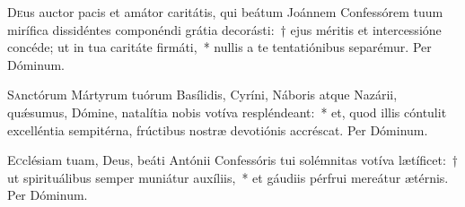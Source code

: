 \documentclass[vesperale_romanum.tex]{subfiles}
\begin{document}

\oratio
\lettrine{D}{e}us auctor pacis et amátor caritátis, qui beátum Joánnem Confessórem tuum mirífica dissidéntes componéndi grátia decorásti:~† ejus méritis et intercessióne concéde; ut in tua caritáte firmáti,~* nullis a te tentatiónibus separémur. Per Dóminum.


\oratio
\lettrine{S}{a}nctórum Mártyrum tuórum Basílidis, Cyríni, Náboris atque Nazárii, quǽsumus, Dómine, natalítia nobis votíva respléndeant:~* et, quod illis cóntulit excelléntia sempitérna, frú\-ctibus nostræ devotiónis accréscat. Per Dóminum.

\capitdeseq

\myrule
\newpage



\duplex



\oratio

\lettrine{E}{c}clésiam tuam, Deus, beáti Antónii Confessóris tui solé\-mnitas votíva lætíficet:~† ut spirituálibus semper muniátur auxíliis,~* et gáudiis pérfrui mereátur ætérnis. Per Dóminum.

\capitdeseq

\myrule



\duplexmtv

\odoctoroptime
\end{document}
